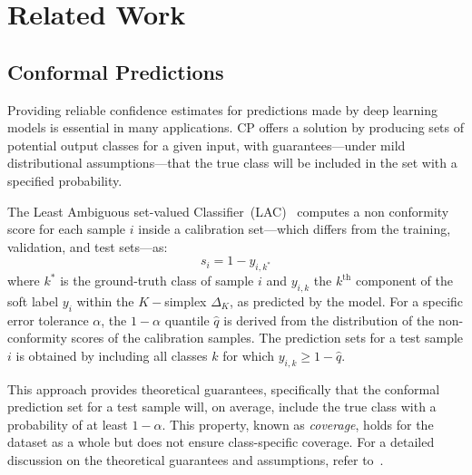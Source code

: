 \section{Related Work}

\subsection{Conformal Predictions}
Providing reliable confidence estimates for predictions made by deep learning models is essential in many applications. CP offers a solution by producing sets of potential output classes for a given input, with guarantees—under mild distributional assumptions—that the true class will be included in the set with a specified probability. 

The Least Ambiguous set-valued Classifier~(LAC)~\cite{vovk2005algorithmic,sadinle2019least,lei2015conformal} computes a non conformity score for each sample $i$ inside a calibration set---which differs from the training, validation, and test sets---as: 
\begin{equation}\label{eq:nonconf}
s_i = 1 - y_{i,k^*}
\end{equation} where $k^*$ is the ground-truth class of sample $i$ and $y_{i,k}$ the $k^{\text{th}}$ component of the soft label $y_i$ within the $K-$simplex $\Delta_K$, as predicted by the model. For a specific error tolerance $\alpha$, the $1 - \alpha$ quantile $\hat{q}$ is derived from the distribution of the non-conformity scores of the calibration samples. The prediction sets for a test sample $i$ is obtained by including all classes $k$ for which $y_{i,k} \geq 1 - \hat{q}$. 

This approach provides theoretical guarantees, specifically that the conformal prediction set for a test sample will, on average, include the true class with a probability of at least $1-\alpha$. This property, known as \textit{coverage}, holds for the dataset as a whole but does not ensure class-specific coverage. For a detailed discussion on the theoretical guarantees and assumptions, refer to~\cite{vovk2005algorithmic,sadinle2019least}. %

